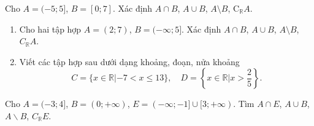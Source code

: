 \begin{bt}%
	Cho $A=(-5;5]$, $B=[0;7]$. Xác định $A \cap B$, $A \cup B$, $A \setminus  B$, $\mathrm{C}_{\mathbb{R}} A$.
	\loigiai{
		Ta có
		
		$A \cap B= [0;5]$,
		
		$A \cup B =(-5;7]$, 
		
		$A \setminus B=(-5;0)$, 
		
		$\mathrm{C}_{\mathbb{R}} A=\mathbb{R}\setminus A = (-\infty;-5] \cup (5;+\infty)$.	
	}
\end{bt}

\begin{bt}%
	\begin{enumerate}
		\item Cho hai tập hợp $A=(2;7)$, $B=(-\infty;5]$. Xác định $A\cap B$, $A\cup B$, $A\setminus B$, $C_\mathbb{R} A$.
		\item Viết các tập hợp sau dưới dạng khoảng, đoạn, nửa khoảng
		\begin{equation*}
			C=\{x\in\mathbb{R}|-7<x\leq13\}, \quad D=\left\{x\in\mathbb{R}\Big|x>\dfrac{2}{5}\right\}.
		\end{equation*}
	\end{enumerate}
	\loigiai{
		\begin{enumerate}
			\item $A\cap B=(2;5]$, $A\cup B =(-\infty;7)$, $A\setminus B=(5;7)$, $C_\mathbb{R}A=(-\infty;2]\cup[7;+\infty)$.
			\item $C=(-7;13]$, $D=\left(\dfrac{2}{5};+\infty\right)$.
		\end{enumerate}
	}
\end{bt}

\begin{bt}%
	Cho $A=(-3 ; 4]$, $B=(0 ;+\infty)$, $E=(-\infty ;-1] \cup[3 ;+\infty)$. Tìm $A\cap E$, $A\cup B$, $A\backslash B$, $C_{\mathbb{R}}{E}$.
	\loigiai{
		Ta có
		\begin{itemize}
			\item $A\cap E=(-3;-1] \cup [3;4]$;
			\item $A\cup B=(-3;+\infty)$;
			\item $A\backslash B=(-3;0]$;
			\item $C_{\mathbb{R}}{E}=(-1;3)$.
		\end{itemize}
	}
\end{bt}

